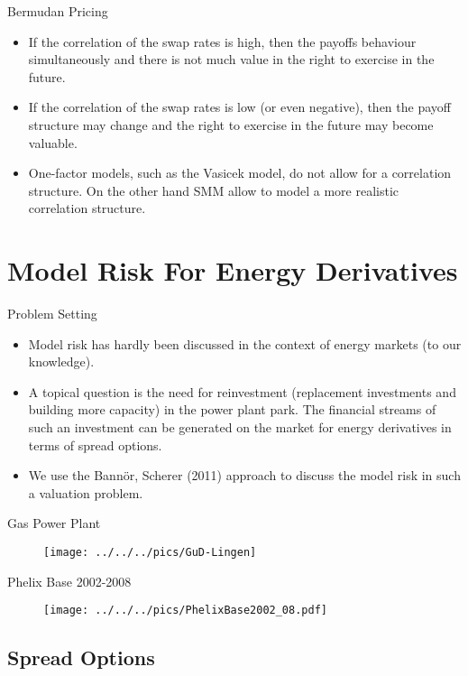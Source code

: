 {Bermudan Pricing}
\begin{itemize}
\item<1->
If the correlation of the swap rates is high, then the payoffs behaviour simultaneously and there is not much value in the right to exercise in the future.
\item<2-> If the correlation of the swap rates is low (or even negative), then the payoff structure may change  and the right to exercise in the future may become valuable.
\item<3-> One-factor models, such as the Vasicek model, do not allow for a correlation structure. On the other hand SMM allow to model a more realistic correlation structure. \end{itemize}

\section{Model Risk For Energy Derivatives}

{Problem Setting}
\begin{itemize}
\item<1-> Model risk has hardly been discussed in the context of energy markets (to our knowledge).
\item<2-> A topical question is the need for reinvestment (replacement investments and building more capacity) in the power plant park. The financial streams of such an investment can be generated on the market for energy derivatives in terms of spread options.
\item<3-> We use the Bann{\"o}r, Scherer (2011) approach to discuss the model risk in such a valuation problem.
\end{itemize}

{Gas Power Plant}
\begin{figure}[htp]
\centering
\texttt{[image: ../../../pics/GuD-Lingen]}
\label{prices}
\end{figure}


{Phelix Base 2002-2008}
\begin{figure}[htp]
\centering
\texttt{[image: ../../../pics/PhelixBase2002\_08.pdf]}

\end{figure}

\subsection{Spread Options}

